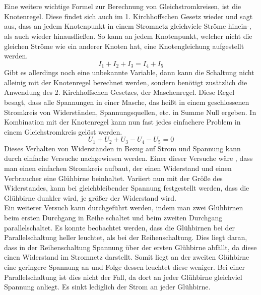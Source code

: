 \\\\
Eine weitere wichtige Formel zur Berechnung von Gleichstromkreisen, ist die Knotenregel. Diese findet sich auch im 1. Kirchhoffschen Gesetz wieder und sagt 
aus, dass an jedem Knotenpunkt in einem Stromnetz gleichviele Ströme hinein-, als auch wieder hinausfließen. So kann an jedem Knotenpunkt, welcher nicht 
die gleichen Ströme wie ein anderer Knoten hat, eine Knotengleichung aufgestellt werden. 
\begin{equation}
I_1+I_2+I_3=I_4+I_5
\label{eqn:1. Kirchhoffsches Gesetz}
\end{equation}
Gibt es allerdings noch eine unbekannte Variable, dann kann die Schaltung nicht alleinig mit der Knotenregel berechnet werden, sondern benötigt zusätzlich die 
Anwendung des 2. Kirchhoffschen Gesetzes, der Maschenregel. Diese Regel besagt, dass alle Spannungen in einer Masche, das heißt in einem geschlossenen Stromkreis 
von Widerständen, Spannungsquellen, etc. in Summe Null ergeben. In Kombination mit der Knotenregel kann nun fast jedes einfachere Problem in einem 
Gleichstromkreis gelöst werden.
\begin{equation}
U_1+U_2+U_3-U_4-U_5=0
\label{eqn:2. Kirchhoffsches Gesetz}
\end{equation}
Dieses Verhalten von Widerständen in Bezug auf Strom und Spannung kann durch einfache Versuche nachgewiesen werden. Einer dieser Versuche wäre \zB, dass 
man einen einfachen Stromkreis aufbaut, der einen Widerstand und einen Verbraucher \zB eine Glühbirne beinhaltet. Variiert nun mit der Größe des 
Widerstandes, kann bei gleichbleibender Spannung festgestellt werden, dass die Glühbirne dunkler wird, je größer der Widerstand wird.\\ 
Ein weiterer Versuch kann durchgeführt werden, indem man zwei Glühbirnen beim ersten Durchgang in Reihe schaltet und beim zweiten Durchgang 
parallelschaltet. Es konnte beobachtet werden, dass die Glühbirnen bei der Parallelschaltung heller leuchtet, als bei der Reihenschaltung. Dies liegt daran, 
dass in der Reihenschaltung Spannung über der ersten Glühbirne abfällt, da diese einen Widerstand im Stromnetz darstellt. Somit liegt an der zweiten 
Glühbirne eine geringere Spannung an und Folge dessen leuchtet diese weniger. Bei einer Parallelschaltung ist dies nicht der Fall, da dort an jeder 
Glühbirne gleichviel Spannung anliegt. Es sinkt lediglich der Strom an jeder Glühbirne. \autocite{Weigerber.2018}
\\\\ 
